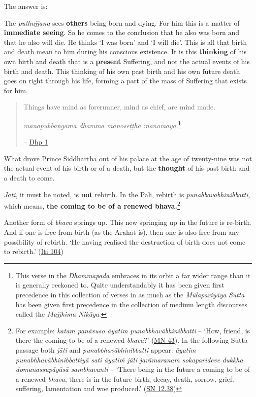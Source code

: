 The answer is:

The \emph{puthujjana} sees \textbf{others} being born and dying. For him this is a matter of \textbf{immediate seeing}. So he comes to the conclusion that he also was born and that he also will die. He thinks `I was born' and `I will die'. This is all that birth and death mean to him during his conscious existence. It is this \textbf{thinking} of his own birth and death that is a \textbf{present} Suffering, and not the actual events of his birth and death. This thinking of his own past birth and his own future death goes on right through his life, forming a part of the mass of Suffering that exists for him.

\begin{quote}
Things have mind as forerunner, mind as chief, are mind made.

\emph{manopubbaṅgamā dhammā manoseṭṭhā manomayā}.\footnote{This verse in the \emph{Dhammapada} embraces in its orbit a far wider range than it is generally reckoned to. Quite understandably it has been given first precedence in this collection of verses in as much as the \emph{Mūlapariyāya Sutta} has been given first precedence in the collection of medium length discourses called the \emph{Majjhima Nikāya}.}

 -- \href{https://suttacentral.net/dhp1-20/en/anandajoti}{Dhp 1}
\end{quote}

What drove Prince Siddhartha out of his palace at the age of twenty-nine was not the actual event of his birth or of a death, but the \textbf{thought} of his past birth and a death to come.

\emph{Jāti}, it must be noted, is \textbf{not} rebirth. In the Pali, rebirth is \emph{punabbavābhinibbatti}, which means, \textbf{the coming to be of a renewed bhava.}\footnote{For example: \emph{katam panāvuso āyatim punabbhavābhinibbatti} -- `How, friend, is there the coming to be of a renewed \emph{bhava}?' (\href{https://suttacentral.net/mn43/en/sujato}{MN 43}). In the following Sutta passage both \emph{jāti} and \emph{punabbhavābhinibbatti} appear: \emph{āyatim punabhhavābhinibbattiyā sati āyatiṁ jāti jarāmaranaṁ sokaparideve dukkha domanassupāyāsā sambhavanti} -- `There being in the future a coming to be of a renewed \emph{bhava}, there is in the future birth, decay, death, sorrow, grief, suffering, lamentation and woe produced.' (\href{https://suttacentral.net/sn12.38/en/bodhi}{SN 12.38})}

Another form of \emph{bhava} springs up. This new springing up in the future is re-birth. And if one is free from birth (as the Arahat is), then one is also free from any possibility of rebirth. `He having realised the destruction of birth does not come to rebirth.' (\href{https://suttacentral.net/iti104/en/sujato}{Iti 104})

